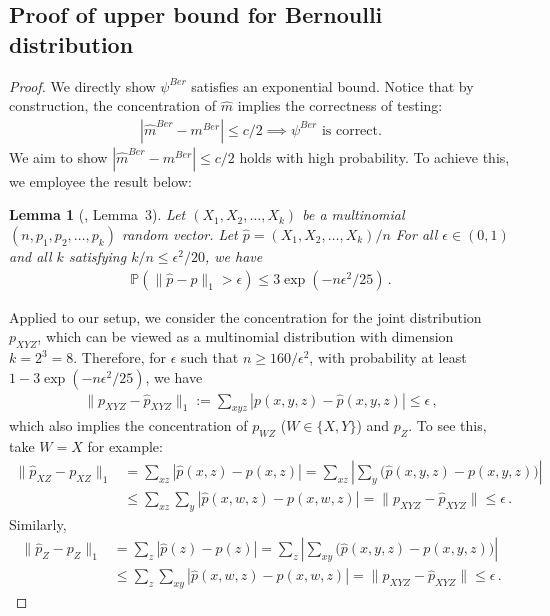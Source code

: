 \documentclass{article}
\newtheorem{lemma}[theorem]{Lemma}
\theoremstyle{definition}
\theoremstyle{definition}
\theoremstyle{definition}
\theoremstyle{definition}
\theoremstyle{definition}
\theoremstyle{definition}
\theoremstyle{remark}
\theoremstyle{remark}
\newcommand{\prob}{\mathbb{P}}
\newcommand{\dpdm}{m}
\begin{document}
\subsection{Proof of upper bound for Bernoulli distribution}\label{app:bern:ub}
\begin{proof}
We directly show $\psi^{Ber}$ satisfies an exponential bound. Notice that by construction, the concentration of $\widehat{\dpdm}$ implies the correctness of testing:
\begin{align*}
    |\widehat{\dpdm}^{Ber} - \dpdm^{Ber}|\le c/2 \implies \psi^{Ber} \text{ is correct.}
\end{align*}
We aim to show $|\widehat{\dpdm}^{Ber} - \dpdm^{Ber}|\le c/2$ holds with high probability. To achieve this, we employee the result below:
\begin{lemma}[\citet{devroye1983equivalence}, Lemma~3]
    Let $(X_1,X_2,\ldots,X_k)$ be a multinomial $(n,p_1,p_2,\ldots,p_k)$ random vector. Let $\widehat{p} = (X_1,X_2,\ldots, X_k) / n$ For all $\epsilon\in (0,1)$ and all $k$ satisfying $k/n\le \epsilon^2/20$, we have
    \begin{align*}
        \prob(\|\widehat{p}-p\|_1 > \epsilon )\le 3\exp(-n\epsilon^2/25) \,.
    \end{align*}
\end{lemma}
Applied to our setup, we consider the concentration for the joint distribution $p_{XYZ}$, which can be viewed as a multinomial distribution with dimension $k=2^3=8$. Therefore, for $\epsilon$ such that $n\ge 160/\epsilon^2$, with probability at least $1- 3\exp(-n\epsilon^2/25)$, we have
\begin{align*}
    \|p_{XYZ} - \widehat{p}_{XYZ}\|_1:=\sum_{xyz}|p(x,y,z) - \widehat{p}(x,y,z)| \le \epsilon \,,
\end{align*}
which also implies the concentration of $p_{WZ}$ ($W\in\{X,Y\}$) and $p_Z$. To see this, take $W=X$ for example:
\begin{align*}
    \|\widehat{p}_{XZ}-p_{XZ}\|_1 & = \sum_{xz}|\widehat{p}(x,z) - p(x,z)| = \sum_{xz}|\sum_y\Big(\widehat{p}(x,y,z) - p(x,y,z)\Big)| \\
    & \le \sum_{xz}\sum_y |\widehat{p}(x,w,z) - p(x,w,z)| = \|p_{XYZ} - \widehat{p}_{XYZ}\|\le \epsilon\,.
\end{align*}
Similarly,
\begin{align*}
    \|\widehat{p}_{Z}-p_{Z}\|_1 & = \sum_{z}|\widehat{p}(z) - p(z)| = \sum_{z}|\sum_{xy}\Big(\widehat{p}(x,y,z) - p(x,y,z)\Big)| \\
    & \le \sum_{z}\sum_{xy} |\widehat{p}(x,w,z) - p(x,w,z)| = \|p_{XYZ} - \widehat{p}_{XYZ}\|\le \epsilon\,.

\end{align*}
\end{proof}
\end{document}
